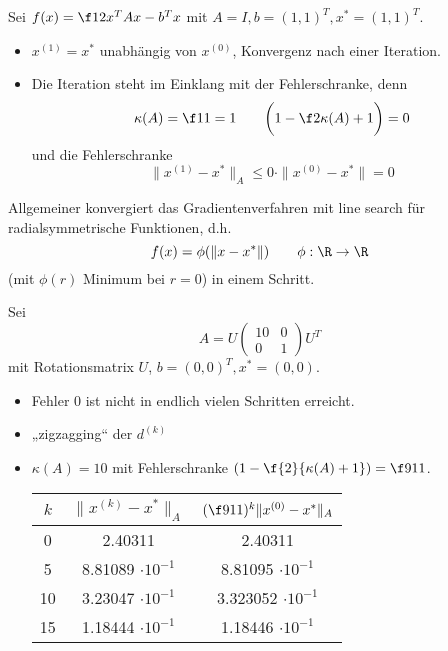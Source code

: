 \documentclass[11pt]{scrbook}
\begin{document}
\begin{ex*}
	Sei $f(x) = \f 12 x^T A x - b^Tx$ mit $A = I, b = (1,1)^T, x^* = (1,1)^T$.
	\begin{itemize}
		\item
			$x^{(1)} = x^*$ unabhängig von $x^{(0)}$, Konvergenz nach einer Iteration.
		\item
			Die Iteration steht im Einklang mit der Fehlerschranke, denn
			\[
				\kappa(A) = \f 11 = 1
				\qquad
				\bigg( 1 - \f 2{\kappa(A) + 1}\bigg) = 0
			\]
			und die Fehlerschranke
			\[
				\|x^{(1)} - x^*\|_A \le 0 \cdot \|x^{(0)} - x^*\| = 0
			\]
	\end{itemize}
	Allgemeiner konvergiert das Gradientenverfahren mit line search für radialsymmetrische Funktionen, d.h.
	\[
		f(x) = \phi(\|x-x^*\|)
		\qquad \phi : \R \to \R
	\]
	(mit $\phi(r)$ Minimum bei $r=0$) in einem Schritt.
\end{ex*}

\begin{ex*}
	Sei
	\[
		A = U \begin{pmatrix}
			10 & 0 \\
			0 & 1
		\end{pmatrix} U^T
	\]
	mit Rotationsmatrix $U$, $b = (0,0)^T, x^* = (0,0)$.
	\begin{itemize}
		\item
			Fehler $0$ ist nicht in endlich vielen Schritten erreicht.
		\item
			„zigzagging“ der $d^{(k)}$
		\item
			$\kappa(A) = 10$ mit Fehlerschranke $(1- \f {2}{\kappa(A)+1}) = \f 9{11}$.
			\begin{table}[H]
				\centering
				\begin{tabular}{c|c|c}
					$k$ & $\|x^{(k)} - x^*\|_A$ & $(\f 9{11})^k \|x^{(0)} - x^*\|_A$ \\ \hline
					0 & 2.40311 & 2.40311 \\
					5 & 8.81089 $\cdot 10^{-1}$ & 8.81095 $\cdot 10^{-1}$ \\
					10 & 3.23047 $\cdot 10^{-1}$ & 3.323052 $\cdot 10^{-1}$ \\
					15 & 1.18444 $\cdot 10^{-1} $& 1.18446 $\cdot 10^{-1}$
				\end{tabular}
			\end{table}
	\end{itemize}
\end{ex*}
\end{document}
